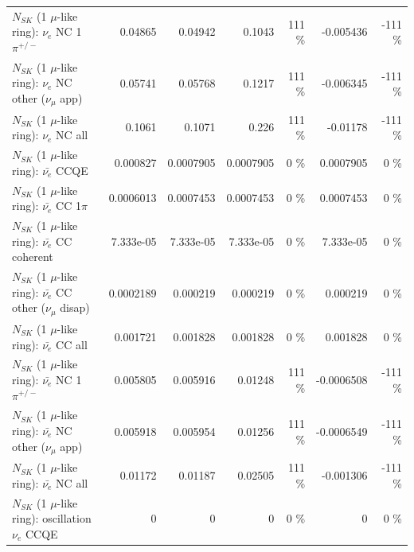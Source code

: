 \begin{table}
\begin{tabular}{| l | r | r | r  r | r  r |}
\hline
                           $N_{SK}$ (1 $\mu$-like ring): $\nu_e$ NC 1$\pi^{+/-}$ &         0.04865 &         0.04942 &          0.1043 &      111 \%  &       -0.005436 &     -111 \%  \\ 
                  $N_{SK}$ (1 $\mu$-like ring): $\nu_e$ NC other ($\nu_\mu$ app) &         0.05741 &         0.05768 &          0.1217 &      111 \%  &       -0.006345 &     -111 \%  \\ 
                                  $N_{SK}$ (1 $\mu$-like ring): $\nu_{e}$ NC all &          0.1061 &          0.1071 &           0.226 &      111 \%  &        -0.01178 &     -111 \%  \\ 
\hline
\hline
\hline
                                $N_{SK}$ (1 $\mu$-like ring): $\bar{\nu_e}$ CCQE &        0.000827 &       0.0007905 &       0.0007905 &        0 \%  &       0.0007905 &        0 \%  \\ 
                           $N_{SK}$ (1 $\mu$-like ring): $\bar{\nu_e}$ CC 1$\pi$ &       0.0006013 &       0.0007453 &       0.0007453 &        0 \%  &       0.0007453 &        0 \%  \\ 
                         $N_{SK}$ (1 $\mu$-like ring): $\bar{\nu_e}$ CC coherent &       7.333e-05 &       7.333e-05 &       7.333e-05 &        0 \%  &       7.333e-05 &        0 \%  \\ 
          $N_{SK}$ (1 $\mu$-like ring): $\bar{\nu_e}$ CC other ($\nu_\mu$ disap) &       0.0002189 &        0.000219 &        0.000219 &        0 \%  &        0.000219 &        0 \%  \\ 
                            $N_{SK}$ (1 $\mu$-like ring): $\bar{\nu_{e}}$ CC all &        0.001721 &        0.001828 &        0.001828 &        0 \%  &        0.001828 &        0 \%  \\ 
\hline
                     $N_{SK}$ (1 $\mu$-like ring): $\bar{\nu_e}$ NC 1$\pi^{+/-}$ &        0.005805 &        0.005916 &         0.01248 &      111 \%  &      -0.0006508 &     -111 \%  \\ 
            $N_{SK}$ (1 $\mu$-like ring): $\bar{\nu_e}$ NC other ($\nu_\mu$ app) &        0.005918 &        0.005954 &         0.01256 &      111 \%  &      -0.0006549 &     -111 \%  \\ 
                            $N_{SK}$ (1 $\mu$-like ring): $\bar{\nu_{e}}$ NC all &         0.01172 &         0.01187 &         0.02505 &      111 \%  &       -0.001306 &     -111 \%  \\ 
\hline
\hline
\hline
                          $N_{SK}$ (1 $\mu$-like ring): oscillation $\nu_e$ CCQE &               0 &               0 &               0 &        0 \%  &               0 &        0 \%  \\ 

\end{tabular}
\end{table}
